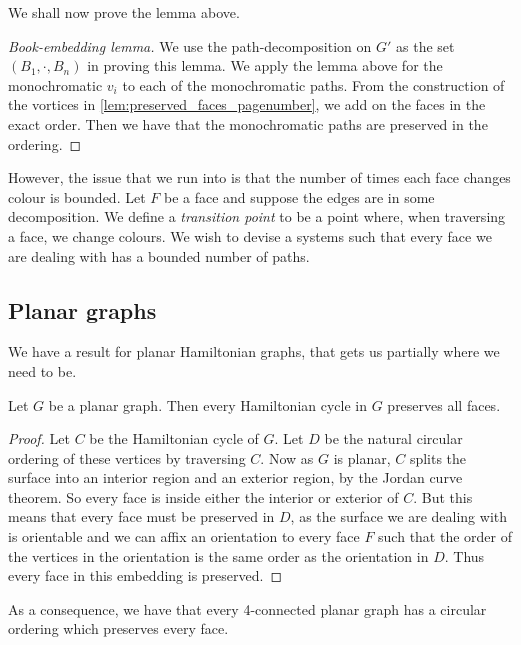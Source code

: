 We shall now prove the lemma above.
\begin{proof}[Book-embedding lemma]
	We use the path-decomposition on $G'$ as the set $(B_1, \cdot , B_n)$ in proving this lemma. We apply the lemma above for the monochromatic $v_i$ to each of the monochromatic paths. From the construction of the vortices in \cref{lem:preserved_faces_pagenumber}, we add on the faces in the exact order. Then we have that the monochromatic paths are preserved in the ordering. 
\end{proof}

However, the issue that we run into is that the number of times each face changes colour is bounded. Let $F$ be a face and suppose the edges are in some decomposition. We define a \textit{transition point} to be a point where, when traversing a face, we change colours. We wish to devise a systems such that every face we are dealing with has a bounded number of paths.

\subsection{Planar graphs}
We have a result for planar Hamiltonian graphs, that gets us partially where we need to be. 
\begin{theorem}
	Let $G$ be a planar graph. Then every Hamiltonian cycle in $G$ preserves all faces. 
\end{theorem}

\begin{proof}
	Let $C$ be the Hamiltonian cycle of $G$. Let $D$ be the natural circular ordering of these vertices by traversing $C$. Now as $G$ is planar, $C$ splits the surface into an interior region and an exterior region, by the Jordan curve theorem. So every face is inside either the interior or exterior of $C$. But this means that every face must be preserved in $D$, as the surface we are dealing with is orientable and we can affix an orientation to every face $F$ such that the order of the vertices in the orientation is the same order as the orientation in $D$. Thus every face in this embedding is preserved. 
	
\end{proof}
As a consequence, we have that every 4-connected planar graph has a circular ordering which preserves every face. 
